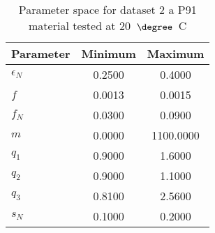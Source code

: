 \begin{table}
\centering
\caption{Parameter space for dataset 2 a P91 material tested at 20~$\degree$~C}
\label{tab:parameter_space_dataset2}
\begin{tabular}{lcc}
\toprule
\textbf{Parameter} & \textbf{Minimum} & \textbf{Maximum}\\
\midrule
\textbf{$\epsilon_N$} &  0.2500 &     0.4000 \\
\textbf{$f$} &  0.0013 &     0.0015 \\
\textbf{$f_N$} &  0.0300 &     0.0900 \\
\textbf{$m$} &  0.0000 &  1100.0000 \\
\textbf{$q_1$} &  0.9000 &     1.6000 \\
\textbf{$q_2$} &  0.9000 &     1.1000 \\
\textbf{$q_3$} &  0.8100 &     2.5600 \\
\textbf{$s_N$} &  0.1000 &     0.2000 \\
\bottomrule
\end{tabular}
\end{table}
